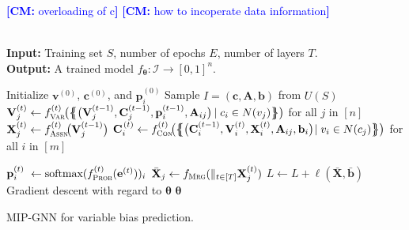 \documentclass[11pt, DIV=12]{scrartcl}
\theoremstyle{definition}
\newcommand{\cI}{\ensuremath{{\mathcal I}}\xspace}
\renewcommand{\vec}[1]{\mathbf{#1}}
\newcommand{\cm}[1]{{{\textcolor{blue}{\textbf{[CM:} {#1}\textbf{]}}}}}
\begin{document}
\cm{overloading of c}
\cm{how to incoperate data information}


\begin{algorithm}[H]\mbox{\hfill}
	\\\textbf{Input:}  Training set $S$, number of epochs $E$, number of layers $T$.  \\
	\textbf{Output:} A trained model $f_{\boldsymbol{\theta}} \colon \cI \to [0,1]^n$.
	\begin{algorithmic}[1]
		\State Initialize $\vec{v}^{(0)}$, $\vec{c}^{(0)}$, and $\vec{p}_i^{(0)}$
		\Statex
		\State Sample $I = (\vec{c}, \vec{A}, \vec{b})$ from $U(S)$ 
		\State $\vec{V}_j^{(t)} \leftarrow f_{\textsc{Var}}^{(t)} \hspace{-1pt} \big( \big\{ \hspace{-4.4pt} \big\{ \big( \vec{V}^{(t-1)}_j, \vec{C}^{(t-1)}_j, \vec{p}^{(t-1)}_i, \vec{A}_{ij} \big)\hspace{-1pt} \mid c_i \in N(v_j) \big\} \hspace{-4.4pt} \big\} \big)$ for all $j$ in $[n]$ 		
		\State $\vec{X}_j^{(t)} \leftarrow f_\textsc{Assn}^{(t)} \hspace{-2pt} \big(\vec{V}_j^{(t-1)} \big)$ 
		\Statex
		\State $\vec{C}_i^{\hspace{1pt}(t)} \leftarrow f_\textsc{Con}^{(t)} \hspace{-2pt} \big( \big\{ \hspace{-4.4pt} \big\{ \big( \vec{C}^{(t-1)}_i, \vec{V}^{(t)}_i, \vec{X}^{(t)}_i, \vec{A}_{ij}, \vec{b}_i \big)\hspace{-2pt} \mid v_i \in N(c_j) \big\} \hspace{-4.4pt} \big\} \big)$ for all $i$ in $[m]$ 	

		\State $\vec{p}_{i}^{(t)} \hspace{3pt}\leftarrow \text{softmax}(f_\textsc{Prob}^{(t)}(\vec{e}^{(t)}))_{i}$
		\EndFor
		\State $\bar{\vec{X}}_j \leftarrow f_\textsc{Mrg}(\mathbin\Vert_{t \in [T]} \vec{X}_j^{(t)})$
		\State $L \leftarrow L + \ell(\vec{\bar{X}}, \vec{\bar b})$ 
		\State Gradient descent  with regard to $\boldsymbol{\theta}$
		\EndFor
		\State \Return $\boldsymbol{\theta}$
		
	\end{algorithmic}
	\caption{MIP-GNN for variable bias prediction.}
	\label{alg:as2}
\end{algorithm}
\end{document}
